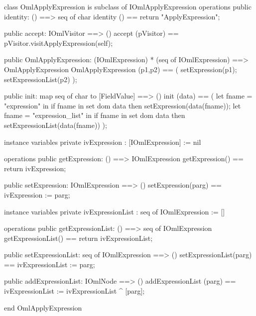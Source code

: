 \begin{vdm_al}
class OmlApplyExpression is subclass of IOmlApplyExpression
operations
  public identity: () ==> seq of char
  identity () == return "ApplyExpression";

  public accept: IOmlVisitor ==> ()
  accept (pVisitor) == pVisitor.visitApplyExpression(self);

  public OmlApplyExpression:
      (IOmlExpression) *
      (seq of IOmlExpression) ==> OmlApplyExpression
  OmlApplyExpression (p1,p2) == 
   ( setExpression(p1);
     setExpressionList(p2) );

  public init: map seq of char to [FieldValue] ==> ()
  init (data) ==
    ( let fname = "expression" in
        if fname in set dom data
        then setExpression(data(fname));
      let fname = "expression_list" in
        if fname in set dom data
        then setExpressionList(data(fname)) );

instance variables
  private ivExpression : [IOmlExpression] := nil

operations
  public getExpression: () ==> IOmlExpression
  getExpression() == return ivExpression;

  public setExpression: IOmlExpression ==> ()
  setExpression(parg) == ivExpression := parg;

instance variables
  private ivExpressionList : seq of IOmlExpression := []

operations
  public getExpressionList: () ==> seq of IOmlExpression
  getExpressionList() == return ivExpressionList;

  public setExpressionList: seq of IOmlExpression ==> ()
  setExpressionList(parg) == ivExpressionList := parg;

  public addExpressionList: IOmlNode ==> ()
  addExpressionList (parg) == ivExpressionList := ivExpressionList ^ [parg];

end OmlApplyExpression
\end{vdm_al}

